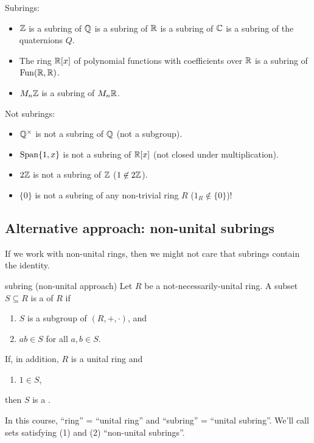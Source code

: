 \documentclass[12pt,letterpaper]{report}
\begin{document}
\begin{ex}
  Subrings:
  \begin{itemize}
    \item $\mathbb{Z}$ is a subring of $\mathbb{Q}$ is a subring of $\mathbb{R}$ is a subring of
      $\mathbb{C}$ is a subring of the quaternions $Q$.
    \item The ring $\mathbb{R}[x]$ of polynomial functions with coefficients over $\mathbb{R}$ is a
      subring of $\operatorname{Fun}(\mathbb{R}, \mathbb{R})$.
    \item $M_n\mathbb{Z}$ is a subring of $M_n\mathbb{R}$.
  \end{itemize}
  Not subrings:
  \begin{itemize}
    \item $\mathbb{Q}^\times$ is not a subring of $\mathbb{Q}$ (not a subgroup).
    \item $\operatorname{Span}\{1, x\}$ is not a subring of $\mathbb{R}[x]$ (not closed under multiplication).
    \item $2\mathbb{Z}$ is not a subring of $\mathbb{Z}$ ($1 \not\in 2\mathbb{Z}$).
    \item $\{0\}$ is not a subring of any non-trivial ring $R$ ($1_R \not\in \{0\}$)!
  \end{itemize}
\end{ex}

\pagebreak
\subsection{Alternative approach: non-unital subrings}

If we work with non-unital rings, then we might not care that subrings contain the identity.

\begin{defn}{subring (non-unital approach)}{}
  Let $R$ be a not-necessarily-unital ring.
  A subset $S \subseteq R$ is a  of $R$ if
  \begin{enumerate}
    \item $S$ is a subgroup of $(R, +, \cdot)$, and
    \item $ab \in S$ for all $a, b \in S$.
  \end{enumerate}
  If, in addition, $R$ is a unital ring and
  \begin{enumerate}[start=3]
    \item $1 \in S$,
  \end{enumerate}
  then $S$ is a .
\end{defn}

In this course, ``ring'' = ``unital ring'' and ``subring'' = ``unital subring''.
We'll call sets satisfying (1) and (2) ``non-unital subrings''.
\end{document}
